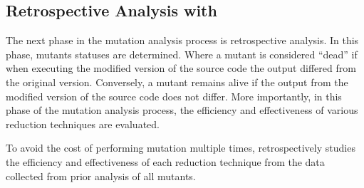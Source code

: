 \subsection{Retrospective Analysis with \mr}

The next phase in the mutation analysis process is retrospective analysis. In this
phase, mutants statuses are determined. Where a mutant is considered
``dead'' if when executing the modified version of the source
code the output differed from the original version. Conversely, a mutant remains alive
if the output from the modified version of the source code does not differ.
More importantly, in this phase of the mutation analysis process,
the efficiency and effectiveness of various reduction techniques are evaluated.

To avoid the cost of performing mutation multiple times, \mr retrospectively studies
the efficiency and effectiveness of each reduction technique from the data collected from
prior analysis of all mutants.
